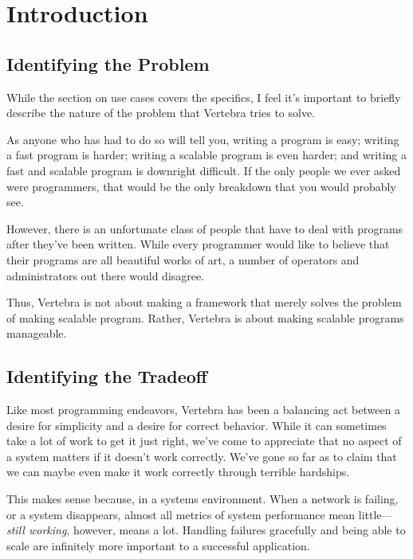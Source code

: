 \chapter{Introduction}

\section*{Identifying the Problem}

While the section on use cases covers the specifics, I feel it's important to briefly describe the nature of the problem that Vertebra tries to solve.

As anyone who has had to do so will tell you, writing a program is easy; writing a fast program is harder; writing a scalable program is even harder; and writing a fast and scalable program is downright difficult.  If the only people we ever asked were programmers, that would be the only breakdown that you would probably see.

However, there is an unfortunate class of people that have to deal with programs after they've been written.  While every programmer would like to believe that their programs are all beautiful works of art, a number of operators and administrators out there would disagree.

Thus, Vertebra is not about making a framework that merely solves the problem of making scalable program.  Rather, Vertebra is about making scalable programs manageable.  

\section*{Identifying the Tradeoff}

Like most programming endeavors, Vertebra has been a balancing act between a desire for simplicity and a desire for correct behavior.  While it can sometimes take a lot of work to get it just right, we've come to appreciate that no aspect of a system matters if it doesn't work correctly.  We've gone so far as to claim that we can maybe even make it work correctly through terrible hardships.

This makes sense because, in a systems environment.  When a network is failing, or a system disappears, almost all metrics of system performance mean little---\emph{still working}, however, means a lot.  Handling failures gracefully and being able to scale are infinitely more important to a successful application.

